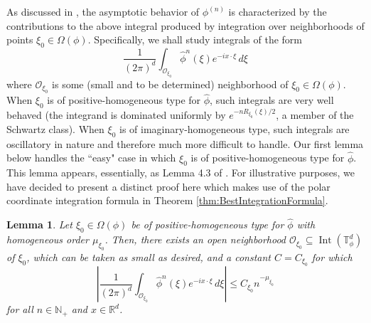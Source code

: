 \documentclass[11pt]{article}
\newtheorem{lemma}[theorem]{Lemma}
\theoremstyle{remark}
\newcommand\Interior{\operatorname{Int}}
\begin{document}
As discussed in \cite{Randles2017}, the asymptotic behavior of $\phi^{(n)}$ is characterized by the contributions to the above integral produced by integration over neighborhoods of points $\xi_0\in\Omega(\phi).$ Specifically, we shall study integrals of the form
\begin{equation}\label{eq:LocalizedFourierInversionConvolutionPower}
\frac{1}{(2\pi)^d}\int_{\mathcal{O}_{\xi_0}}\widehat{\phi}^n(\xi)e^{-ix\cdot\xi}\,d\xi
\end{equation}
where $\mathcal{O}_{\xi_0}$ is some (small and to be determined) neighborhood of $\xi_0\in\Omega(\phi)$. When $\xi_0$ is of positive-homogeneous type for $\widehat{\phi}$, such integrals are very well behaved (the integrand is dominated uniformly by $e^{-nR_{\xi_0}(\xi)/2}$, a member of the Schwartz class). When $\xi_0$ is of imaginary-homogeneous type, such integrals are oscillatory in nature and therefore much more difficult to handle. Our first lemma below handles the ``easy" case in which $\xi_0$ is of positive-homogeneous type for $\widehat{\phi}$. This lemma appears, essentially, as Lemma 4.3 of \cite{Randles2017}. For illustrative purposes, we have decided to present a distinct proof here which makes use of the polar coordinate integration formula in Theorem \ref{thm:BestIntegrationFormula}. 
\begin{lemma}\label{lem:EstPosHom}
Let $\xi_0\in\Omega(\phi)$ be of positive-homogeneous type for $\widehat{\phi}$ with homogeneous order $\mu_{\xi_0}$. Then, there exists an open neighborhood $\mathcal{O}_{\xi_0}\subseteq\Interior(\mathbb{T}^d_\phi)$ of $\xi_0$, which can be taken as small as desired, and a constant $C=C_{\xi_0}$ for which
\begin{equation*}
    \left|\frac{1}{(2\pi)^d}\int_{\mathcal{O}_{\xi_0}}\widehat{\phi}^n(\xi)e^{-ix\cdot\xi}\,d\xi\right|\leq 
    C_{\xi_0} n^{-\mu_{\xi_0}}
\end{equation*}
for all $n\in\mathbb{N}_+$ and $x\in\mathbb{R}^d$.
\end{lemma}
\end{document}
